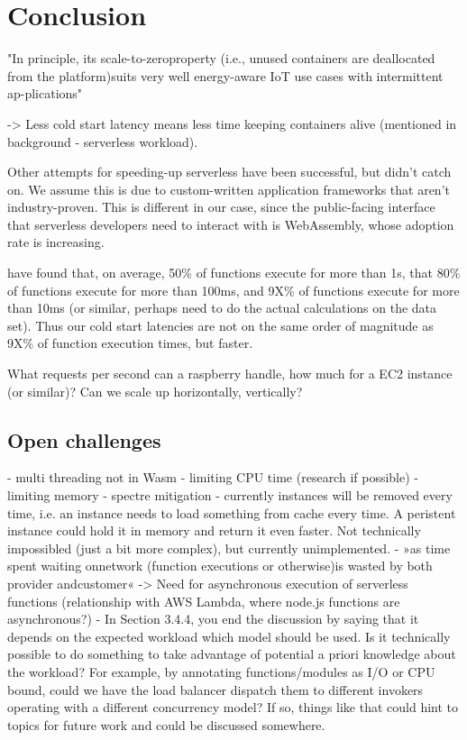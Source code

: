 \chapter{Conclusion}
\label{chapter:conclusion}

"In principle, its scale-to-zeroproperty (i.e., unused containers are deallocated from the platform)suits very well energy-aware IoT use cases with intermittent ap-plications" \cite{Aslanpour2021}

-> Less cold start latency means less time keeping containers alive (mentioned in background - serverless workload).

Other attempts for speeding-up serverless have been successful, but didn't catch on. We assume this is due to custom-written application frameworks that aren't industry-proven. This is different in our case, since the public-facing interface that serverless developers need to interact with is WebAssembly, whose adoption rate is increasing.

\citeauthor{Shahrad2020} have found that, on average, 50\% of functions execute for more than 1s, that 80\% of functions execute for more than 100ms, and 9X\% of functions execute for more than 10ms (or similar, perhaps need to do the actual calculations on the data set). Thus our cold start latencies are not on the same order of magnitude as 9X\% of function execution times, but faster.

What requests per second can a raspberry handle, how much for a EC2 instance (or similar)? Can we scale up horizontally, vertically?

\section{Open challenges}

- multi threading not in Wasm
- limiting CPU time (research if possible)
- limiting memory
- spectre mitigation
- currently instances will be removed every time, i.e. an instance needs to load something from cache every time. A peristent instance could hold it in memory and return it even faster. Not technically impossibled (just a bit more complex), but currently unimplemented.
- »as ​​time ​​spent ​​waiting on ​​network ​​(function ​​executions ​​or ​​otherwise)is ​​wasted ​​by ​​both ​​provider ​and ​customer« \citeauthor{Fox2017} -> Need for asynchronous execution of serverless functions (relationship with AWS Lambda, where node.js functions are asynchronous?)
- In Section 3.4.4, you end the discussion by saying that it depends on the expected workload which model should be used. Is it technically possible to do something to take advantage of potential a priori knowledge about the workload? For example, by annotating functions/modules as I/O or CPU bound, could we have the load balancer dispatch them to different invokers operating with a different concurrency model? If so, things like that could hint to topics for future work and could be discussed somewhere. 
